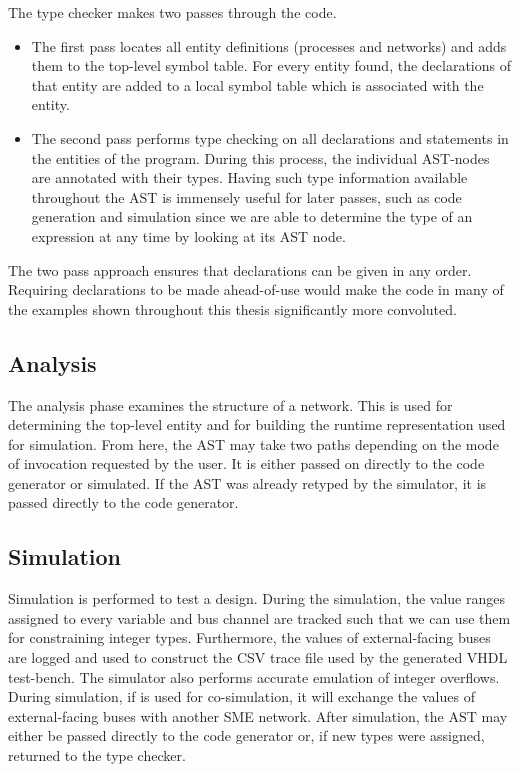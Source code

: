The type checker makes two passes through the code.
\begin{itemize}
\item The first pass locates all entity definitions (processes and networks) and
  adds them to the top-level symbol table. For every entity found, the
  declarations of that entity are added to a local symbol table which is
  associated with the entity.
\item The second pass performs type checking on all declarations and statements
  in the entities of the program. During this process, the individual AST-nodes
  are annotated with their types.  Having
  such type information available throughout the AST is immensely useful for
  later passes, such as code generation and simulation since we are able to
  determine the type of an expression at any time by looking at its AST node.

\end{itemize}

The two pass approach ensures that declarations can be given in any
order. Requiring declarations to be made ahead-of-use would make the code in
many of the examples shown throughout this thesis significantly more convoluted.
  
\subsection{Analysis} The analysis phase examines the structure of a network.
This is used for determining the top-level entity and for building the runtime
representation used for simulation. From here, the AST may take two paths
depending on the mode of invocation requested by the user. It is either passed
on directly to the code generator or simulated. If the AST was already retyped
by the simulator, it is passed directly to the code generator.

\subsection{Simulation}
Simulation is performed to test a design. During the simulation, the value
ranges assigned to every variable and bus channel are tracked such that we can
use them for constraining integer types. Furthermore, the values of
external-facing buses are logged and used to construct the CSV trace file used
by the generated VHDL test-bench.  The simulator also performs accurate emulation of integer
overflows. During simulation, if \libsme{} is used for co-simulation, it will
exchange the values of external-facing buses with another SME network. After
simulation, the AST may either be passed directly to the code generator or, if
new types were assigned, returned to the type checker.

